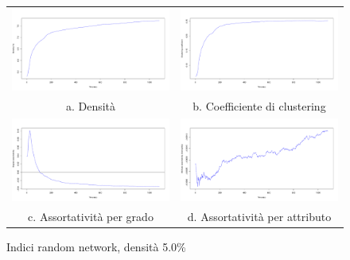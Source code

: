 \documentclass[a4paper,12pt]{article}
\begin{document}
\begin{figure}[H]
\begin{tabular}{cc}
  \includegraphics[width=81mm]{images/evolution_1000_rnd_1080_5_0.pdf} &   \includegraphics[width=81mm]{images/clustering_1000_rnd_1080_5_0.pdf} \\
a. Densità & b. Coefficiente di clustering \\[6pt]
 \includegraphics[width=81mm]{images/deg_assortativity_1000_rnd_1080_5_0.pdf} &   \includegraphics[width=81mm]{images/homophily_1000_rnd_1080_5_0.pdf} \\
c. Assortatività per grado & d. Assortatività per attributo \\[6pt]
\end{tabular}
\centering
\caption{Indici random network, densità 5.0\%}
\label{fig:rnd5}
\end{figure}
\end{document}
